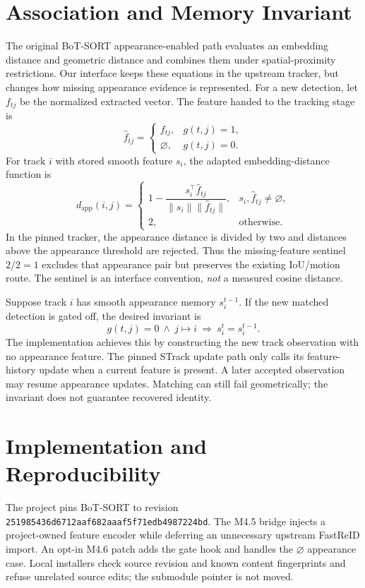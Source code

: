 \documentclass[11pt,a4paper]{article}
\newcommand{\codestr}[1]{\texttt{#1}}
\begin{document}
\section{Association and Memory Invariant}
The original BoT-SORT appearance-enabled path evaluates an embedding distance and geometric distance and combines them under spatial-proximity restrictions. Our interface keeps these equations in the upstream tracker, but changes how missing appearance evidence is represented. For a new detection, let $f_{tj}$ be the normalized extracted vector. The feature handed to the tracking stage is
\begin{equation}
\widehat f_{tj}=\begin{cases}
f_{tj}, & g(t,j)=1,\\
\varnothing, & g(t,j)=0.
\end{cases}
\label{eq:masked-feature}
\end{equation}
For track $i$ with stored smooth feature $s_i$, the adapted embedding-distance function is
\begin{equation}
d_{\mathrm{app}}(i,j)=\begin{cases}
1-\dfrac{s_i^\top\widehat f_{tj}}{\lVert s_i\rVert\lVert\widehat f_{tj}\rVert}, & s_i,\widehat f_{tj}\ne\varnothing,\\[5pt]
2, & \text{otherwise.}
\end{cases}
\label{eq:distance}
\end{equation}
In the pinned tracker, the appearance distance is divided by two and distances above the appearance threshold are rejected. Thus the missing-feature sentinel $2/2=1$ excludes that appearance pair but preserves the existing IoU/motion route. The sentinel is an interface convention, \emph{not} a measured cosine distance.

Suppose track $i$ has smooth appearance memory $s_i^{t-1}$. If the new matched detection is gated off, the desired invariant is
\begin{equation}
g(t,j)=0\ \land\ j\mapsto i\ \Longrightarrow\ s_i^t=s_i^{t-1}.
\label{eq:invariant}
\end{equation}
The implementation achieves this by constructing the new track observation with no appearance feature. The pinned STrack update path only calls its feature-history update when a current feature is present. A later accepted observation may resume appearance updates. Matching can still fail geometrically; the invariant does not guarantee recovered identity.

\section{Implementation and Reproducibility}
The project pins BoT-SORT to revision \codestr{251985436d6712aaf682aaaf5f71edb4987224bd}. The M4.5 bridge injects a project-owned feature encoder while deferring an unnecessary upstream FastReID import. An opt-in M4.6 patch adds the gate hook and handles the $\varnothing$ appearance case. Local installers check source revision and known content fingerprints and refuse unrelated source edits; the submodule pointer is not moved.
\end{document}
